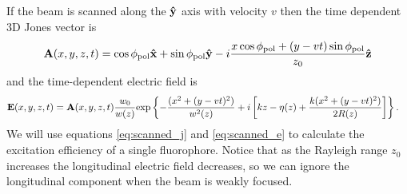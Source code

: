 \documentclass[11pt]{article}
\begin{document}
If the beam is scanned along the $\mathbf{\hat{y}}$ axis with velocity $v$ then the time
dependent 3D Jones vector is
\begin{align}
  \mathbf{A}(x,y,z,t) = \cos\phi_{\text{pol}}\mathbf{\hat{x}} + \sin\phi_{\text{pol}}\mathbf{\hat{y}} - i\frac{x\cos\phi_{\text{pol}} + (y - vt)\sin\phi_{\text{pol}}}{z_0}\mathbf{\hat{z}}\label{eq:scanned_j}
\end{align}
and the time-dependent electric field is
\begin{align}
  \mathbf{E}(x,y,z,t) &= \mathbf{A}(x,y,z,t)\frac{w_0}{w(z)}\text{exp}\left\{{-\frac{(x^2+(y-vt)^2)}{w^2(z)}}+i\left[kz - \eta(z) + \frac{k(x^2+(y-vt)^2)}{2R(z)}\right]\right\}\label{eq:scanned_e}.
\end{align}
We will use equations \ref{eq:scanned_j} and \ref{eq:scanned_e} to calculate
the excitation efficiency of a single fluorophore. Notice that as the Rayleigh
range $z_0$ increases the longitudinal electric field decreases, so we can ignore the
longitudinal component when the beam is weakly focused.
\end{document}
